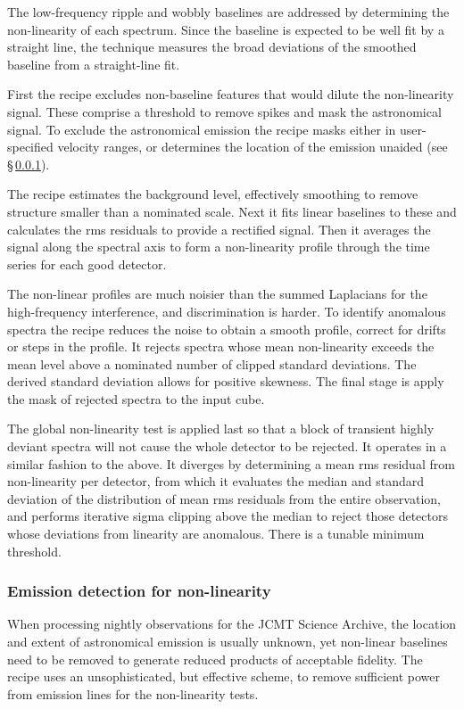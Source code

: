 \documentclass[final,authoryear,5p,times,twocolumn]{elsarticle}
\begin{document}
The low-frequency ripple and wobbly baselines are addressed by
determining the non-linearity of each spectrum.  Since the baseline
is expected to be well fit by a straight line, the technique
measures the broad deviations of the smoothed baseline from a
straight-line fit.

First the recipe excludes non-baseline features that would dilute the
non-linearity signal.  These comprise a threshold to remove spikes and
mask the astronomical signal.  To exclude the astronomical emission
the recipe masks either in user-specified velocity ranges, or
determines the location of the emission unaided (see
\S\,\ref{sec:emission_detection}).

The recipe estimates the background level, effectively smoothing to
remove structure smaller than a nominated scale.  Next it fits linear
baselines to these and calculates the rms residuals to provide a
rectified signal.  Then it averages the signal along the spectral axis
to form a non-linearity profile through the time series for each good
detector.

The non-linear profiles are much noisier than the summed Laplacians
for the high-frequency interference, and discrimination is harder.  To
identify anomalous spectra the recipe reduces the noise to obtain a
smooth profile, correct for drifts or steps in the profile.  It
rejects spectra whose mean non-linearity exceeds the mean level above
a nominated number of clipped standard deviations.  The derived
standard deviation allows for positive skewness.  The final stage
is apply the mask of rejected spectra to the input cube.

The global non-linearity test is applied last so that a block of
transient highly deviant spectra will not cause the whole detector to
be rejected.  It operates in a similar fashion to the above.  It
diverges by determining a mean rms residual from non-linearity per
detector, from which it evaluates the median and standard deviation of
the distribution of mean rms residuals from the entire observation,
and performs iterative sigma clipping above the median to reject those
detectors whose deviations from linearity are anomalous.  There is a
tunable minimum threshold.

\subsubsection{Emission detection for non-linearity}
\label{sec:emission_detection}

When processing nightly observations for the JCMT Science Archive, the
location and extent of astronomical emission is usually unknown, yet
non-linear baselines need to be removed to generate reduced products
of acceptable fidelity.  The recipe uses an unsophisticated, but
effective scheme, to remove sufficient power from emission lines for
the non-linearity tests.
\end{document}
